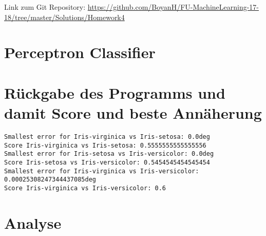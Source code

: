 \usepackage{graphicx}
\usepackage{amsmath}
\usepackage{amssymb}
\usepackage{fancyvrb}

\newcommand{\dozent}{Prof. R. Rojas}					%
\newcommand{\projectNo}{4}
\newcommand{\veranstaltung}{Mustererkennung}
\newcommand{\semester}{WS17/18}
\newcommand{\studenten}{Boyan Hristov, Nedeltscho Petrov}





Link zum Git Repository: \url{https://github.com/BoyanH/FU-MachineLearning-17-18/tree/master/Solutions/Homework\projectNo}

\section*{Perceptron Classifier}


\section*{Rückgabe des Programms und damit Score und beste Annäherung}
\begin{lstlisting}
Smallest error for Iris-virginica vs Iris-setosa: 0.0deg
Score Iris-virginica vs Iris-setosa: 0.5555555555555556
Smallest error for Iris-setosa vs Iris-versicolor: 0.0deg
Score Iris-setosa vs Iris-versicolor: 0.5454545454545454
Smallest error for Iris-virginica vs Iris-versicolor: 0.00025308247344437085deg
Score Iris-virginica vs Iris-versicolor: 0.6
\end{lstlisting}

\section*{Analyse}




